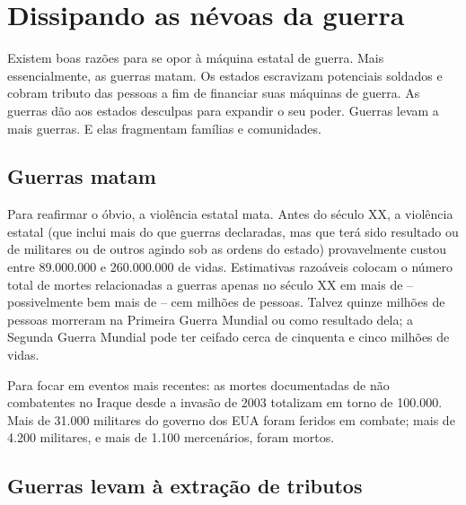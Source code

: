 \section{Dissipando as névoas da guerra}

Existem boas razões para se opor à máquina estatal de guerra. Mais essencialmente, as guerras matam. Os estados escravizam potenciais soldados e cobram tributo das pessoas a fim de financiar suas máquinas de guerra. As guerras dão aos estados desculpas para expandir o seu poder. Guerras levam a mais guerras. E elas fragmentam famílias e comunidades.

\subsection*{Guerras matam}

Para reafirmar o óbvio, a violência estatal mata. Antes do século XX, a violência estatal (que inclui mais do que guerras declaradas, mas que terá sido resultado ou de militares ou de outros agindo sob as ordens do estado) provavelmente custou entre 89.000.000 e 260.000.000 de vidas. Estimativas razoáveis colocam o número total de mortes relacionadas a guerras apenas no século XX em mais de -- possivelmente bem mais de -- cem milhões de pessoas. Talvez quinze milhões de pessoas morreram na Primeira Guerra Mundial ou como resultado dela; a Segunda Guerra Mundial pode ter ceifado cerca de cinquenta e cinco milhões de vidas.

Para focar em eventos mais recentes: as mortes documentadas de não combatentes no Iraque desde a invasão de 2003 totalizam em torno de 100.000. Mais de 31.000 militares do governo dos EUA foram feridos em combate; mais de 4.200 militares, e mais de 1.100 mercenários, foram mortos.

\subsection*{Guerras levam à extração de tributos}

